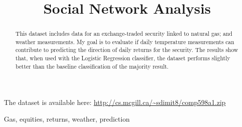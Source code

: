 \documentclass[conference,letterpaper]{IEEEtran}
\begin{document}
\title{\huge Social Network Analysis}

\author{
}

\maketitle
\begin{abstract}
This dataset includes data for an exchange-traded security linked to natural gas; and weather measurements. My goal is to evaluate if daily temperature measurements
can contribute to predicting the direction of daily returns for the security. The results show that, when used with the Logistic Regression classifier, the dataset
performs slightly better than the baseline classification of the majority result.
\\
\end{abstract}

The dataset is available here: \url{http://cs.mcgill.ca/~sdimit8/comp598a1.zip} \\

\begin{keywords}
Gas, equities, returns, weather, prediction
\end{keywords}
\end{document}
